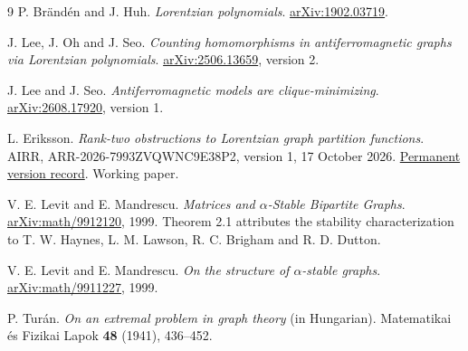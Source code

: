 \documentclass[11pt]{article}
\theoremstyle{remark}\newtheorem{remark}[theorem]{Remark}
\begin{document}
\begin{thebibliography}{9}
P. Br\"and\'en and J. Huh.
\emph{Lorentzian polynomials}.
\href{https://arxiv.org/abs/1902.03719}{arXiv:1902.03719}.

J. Lee, J. Oh and J. Seo.
\emph{Counting homomorphisms in antiferromagnetic graphs via
Lorentzian polynomials}.
\href{https://arxiv.org/abs/2506.13659}{arXiv:2506.13659}, version 2.

J. Lee and J. Seo.
\emph{Antiferromagnetic models are clique-minimizing}.
\href{https://arxiv.org/abs/2608.17920}{arXiv:2608.17920}, version 1.

L. Eriksson.
\emph{Rank-two obstructions to Lorentzian graph partition functions}.
AIRR, ARR-2026-7993ZVQWNC9E38P2, version 1, 17 October 2026.
\href{https://airr.science/papers/ARR-2026-7993ZVQWNC9E38P2/versions/v1/}
{Permanent version record}. Working paper.

V. E. Levit and E. Mandrescu.
\emph{Matrices and $\alpha$-Stable Bipartite Graphs}.
\href{https://arxiv.org/abs/math/9912120}{arXiv:math/9912120}, 1999.
Theorem 2.1 attributes the stability characterization to
T. W. Haynes, L. M. Lawson, R. C. Brigham and R. D. Dutton.

V. E. Levit and E. Mandrescu.
\emph{On the structure of $\alpha$-stable graphs}.
\href{https://arxiv.org/abs/math/9911227}{arXiv:math/9911227}, 1999.

P. Tur\'an.
\emph{On an extremal problem in graph theory} (in Hungarian).
Matematikai \'es Fizikai Lapok \textbf{48} (1941), 436--452.
\end{thebibliography}
\end{document}
